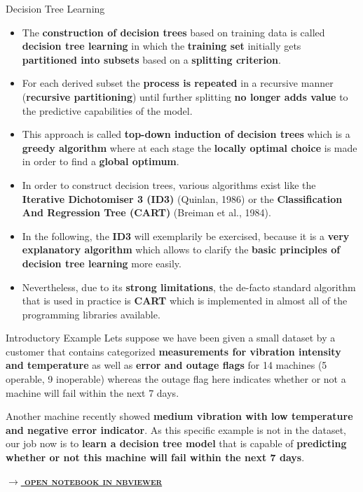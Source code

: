 \documentclass[document.tex]{subfiles}
\begin{document}
    \begin{frame}{Decision Tree Learning}
        \begin{itemize}
            \item The \textbf{construction of decision trees} based on training data is called \textbf{decision tree learning} in which the \textbf{training set} initially gets \textbf{partitioned into subsets} based on a \textbf{splitting criterion}. 
            \item For each derived subset the \textbf{process is repeated} in a recursive manner (\textbf{recursive partitioning}) until further splitting \textbf{no longer adds value} to the predictive capabilities of the model.
            \item This approach is called \textbf{top-down induction of decision trees} which is a \textbf{greedy algorithm} where at each stage the \textbf{locally optimal choice} is made in order to find a \textbf{global optimum}. 
            \item In order to construct decision trees, various algorithms exist like the \textbf{Iterative Dichotomiser 3 (ID3)} (Quinlan, 1986) or the \textbf{Classification And Regression Tree (CART)} (Breiman et al., 1984).
            \item In the following, the \textbf{ID3} will exemplarily be exercised, because it is a \textbf{very explanatory algorithm} which allows to clarify the \textbf{basic principles of decision tree learning} more easily. 
            \item Nevertheless, due to its \textbf{strong limitations}, the de-facto standard algorithm that is used in practice is \textbf{CART} which is implemented in almost all of the programming libraries available.
        \end{itemize}
    \end{frame}

    \begin{frame}{Introductory Example}
        Lets suppose we have been given a small dataset by a customer that contains categorized \textbf{measurements for vibration intensity and temperature} as well as \textbf{error and outage flags} for 14 machines (5 operable, 9 inoperable) whereas the outage flag here indicates whether or not a machine will fail within the next 7 days.

        \begin{table}
            \scalebox{0.8}{}
        \end{table}
        
        Another machine recently showed \textbf{medium vibration with low temperature and negative error indicator}. As this specific example is not in the dataset, our job now is to \textbf{learn a decision tree model} that is capable of \textbf{predicting whether or not this machine will fail within the next 7 days}.
        
        \small{\href{https://nbviewer.jupyter.org/github/saschaschworm/big-data-and-data-science/blob/master/notebooks/demos/outage-decision-tree-learning.ipynb}{\textsc{\textbf{$\rightarrow$ open notebook in nbviewer}}}}
    \end{frame}
\end{document}
